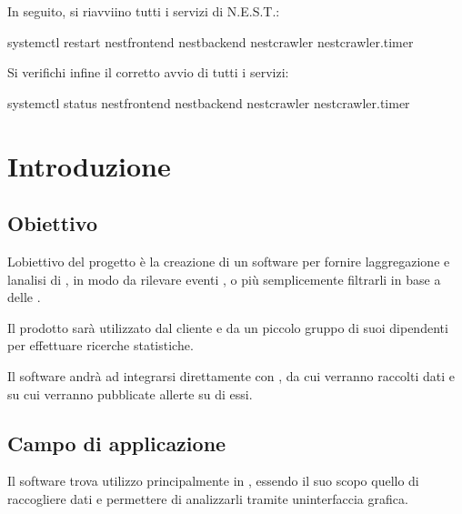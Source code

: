 \documentclass[letterpaper,10pt,italian]{sphinxmanual}
\begin{document}
\sphinxAtStartPar
In seguito, si riavviino tutti i servizi di N.E.S.T.:

\begin{sphinxVerbatim}[commandchars=\\\{\}]
systemctl restart nest\PYGZhy{}frontend nest\PYGZhy{}backend nest\PYGZhy{}crawler nest\PYGZhy{}crawler.timer
\end{sphinxVerbatim}

\sphinxAtStartPar
Si verifichi infine il corretto avvio di tutti i servizi:

\begin{sphinxVerbatim}[commandchars=\\\{\}]
systemctl status nest\PYGZhy{}frontend nest\PYGZhy{}backend nest\PYGZhy{}crawler nest\PYGZhy{}crawler.timer
\end{sphinxVerbatim}


\chapter{Introduzione}
\label{\detokenize{development/goals:introduzione}}\label{\detokenize{development/goals::doc}}

\section{Obiettivo}
\label{\detokenize{development/goals:obiettivo}}
\sphinxAtStartPar
L\textquotesingle{}obiettivo del progetto è la creazione di un software per fornire l\textquotesingle{}aggregazione e l\textquotesingle{}analisi di , in modo da
rilevare eventi ,  o più semplicemente filtrarli in base a delle .

\sphinxAtStartPar
Il prodotto sarà utilizzato dal cliente e da un piccolo gruppo di suoi dipendenti per effettuare ricerche statistiche.

\sphinxAtStartPar
Il software andrà ad integrarsi direttamente con , da cui verranno raccolti dati e su cui verranno pubblicate
allerte su di essi.


\section{Campo di applicazione}
\label{\detokenize{development/goals:campo-di-applicazione}}
\sphinxAtStartPar
Il software trova utilizzo principalmente in , essendo il suo scopo quello di raccogliere dati e
permettere di analizzarli tramite un\textquotesingle{}interfaccia grafica.
\end{document}
